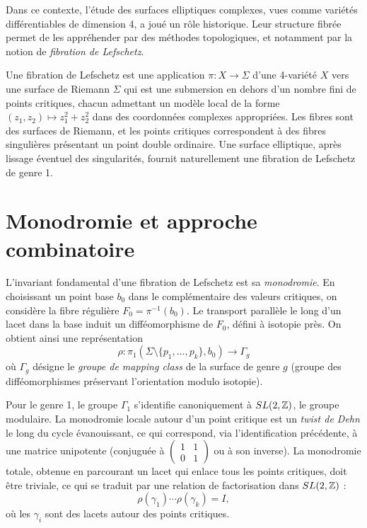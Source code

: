 Dans ce contexte, l'étude des surfaces elliptiques complexes, vues comme variétés différentiables de dimension 4, a joué un rôle historique. Leur structure fibrée permet de les appréhender par des méthodes topologiques, et notamment par la notion de \emph{fibration de Lefschetz}.

Une fibration de Lefschetz est une application $\pi: X \to \Sigma$ d'une 4-variété $X$ vers une surface de Riemann $\Sigma$ qui est une submersion en dehors d'un nombre fini de points critiques, chacun admettant un modèle local de la forme $(z_1, z_2) \mapsto z_1^2 + z_2^2$ dans des coordonnées complexes appropriées. Les fibres sont des surfaces de Riemann, et les points critiques correspondent à des fibres singulières présentant un point double ordinaire. Une surface elliptique, après lissage éventuel des singularités, fournit naturellement une fibration de Lefschetz de genre 1.

\section*{Monodromie et approche combinatoire}

L'invariant fondamental d'une fibration de Lefschetz est sa \emph{monodromie}. En choisissant un point base $b_0$ dans le complémentaire des valeurs critiques, on considère la fibre régulière $F_0 = \pi^{-1}(b_0)$. Le transport parallèle le long d'un lacet dans la base induit un difféomorphisme de $F_0$, défini à isotopie près. On obtient ainsi une représentation
\[
\rho: \pi_1(\Sigma \setminus \{p_1, \dots, p_k\}, b_0) \longrightarrow \Gamma_g
\]
où $\Gamma_g$ désigne le \emph{groupe de mapping class} de la surface de genre $g$ (groupe des difféomorphismes préservant l'orientation modulo isotopie).

Pour le genre 1, le groupe $\Gamma_1$ s'identifie canoniquement à $SL(2,\mathbb{Z})$, le groupe modulaire. La monodromie locale autour d'un point critique est un \emph{twist de Dehn} le long du cycle évanouissant, ce qui correspond, via l'identification précédente, à une matrice unipotente (conjuguée à $\begin{pmatrix} 1 & 1 \\ 0 & 1 \end{pmatrix}$ ou à son inverse). La monodromie totale, obtenue en parcourant un lacet qui enlace tous les points critiques, doit être triviale, ce qui se traduit par une relation de factorisation dans $SL(2,\mathbb{Z})$ :
\[
\rho(\gamma_1) \cdots \rho(\gamma_k) = I,
\]
où les $\gamma_i$ sont des lacets autour des points critiques.

